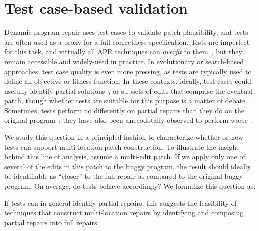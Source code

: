 \documentclass[10pt, conference]{IEEEtran}
\begin{document}
\section{Test case-based validation}
\label{sec:tests}

Dynamic program repair uses test cases to validate patch plausibility, and tests
are often used as a proxy for a full correctness specification. Tests are
imperfect for this task, and virtually all APR techniques can \emph{overfit} to
them~\cite{Smith15fse}, but they remain accessible and widely-used in practice.
%
In evolutionary or search-based approaches, test case quality is even more
pressing, as tests are typically used to define an objective or fitness
function. In these contexts, ideally, test cases could usefully identify partial
solutions~\cite{better-fitness}, or subsets of edits that comprise the eventual
patch, though whether tests are suitable for this purpose is a matter of
debate~\cite{ae,rsrepair}.  Sometimes, tests perform no differently on partial
repairs than they do on the original program~\cite{chris-thesis,
  source-code-checkpoint}; they have also been anecodotally observed to perform
worse~\cite{gecco09}.  

We study this question in a principled fashion to characterize whether or how
tests can support multi-location patch construction. To illustrate the insight
behind this line of analysis, assume a multi-edit patch. If we apply only one of
several of the edits in this patch to the buggy program, the result should
ideally be identifiable as ``closer'' to the full repair as compared to the
original buggy program. On average, do tests behave accordingly? We formalize
this question as:


If tests can in general identify partial repairs, this suggests the feasibility
of techniques that construct multi-location repairs by identifying and composing
partial repairs into full repairs.  

\end{document}
